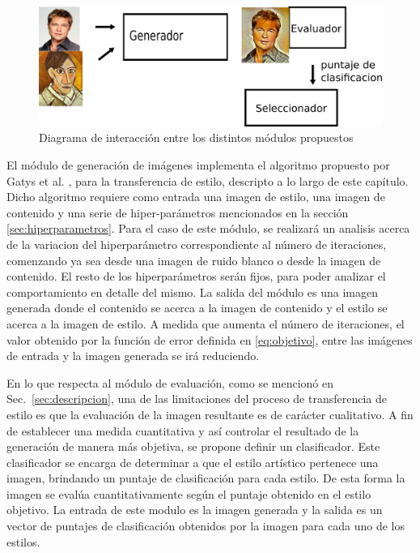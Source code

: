 \documentclass[a4paper,11pt,spanish]{book}
\begin{document}
      \begin{figure}[h]
	\begin{center}
	  \includegraphics[width=\linewidth]{./img/diagrama.png}
	\end{center}
	\caption{Diagrama de interacción entre los distintos módulos propuestos}
	\label{fig:diagrama}
      \end{figure}

      
      El módulo de generación de imágenes implementa el algoritmo propuesto por Gatys et al. \cite{Gatys:Neural_Style}, para la transferencia de estilo, descripto a lo largo 
      de este capítulo. 
      Dicho algoritmo requiere como entrada una imagen de estilo, una imagen de contenido y una serie de hiper-parámetros mencionados en la sección \ref{sec:hiperparametros}.
      Para el caso de este módulo, se realizará un analisis acerca de la variacion del hiperparámetro correspondiente al número de iteraciones, comenzando ya sea desde una imagen
      de ruido blanco o desde la imagen de contenido. El resto de los hiperparámetros serán fijos, para poder analizar el comportamiento en detalle del mismo.
      La salida del módulo es una imagen generada donde el contenido se acerca a la imagen de contenido y el estilo se acerca a la imagen de estilo. 
      A medida que aumenta el número de iteraciones, el valor obtenido por la función de error definida en \eqref{eq:objetivo}, entre las imágenes de entrada y la imagen 
      generada se irá reduciendo. 

      En lo que respecta al módulo de evaluación, como se mencionó en Sec.~\ref{sec:descripcion}, una de las limitaciones del proceso de transferencia de estilo 
      es que la evaluación de la imagen resultante es de carácter cualitativo.
      A fin de establecer una medida cuantitativa y así controlar el resultado de la generación de manera más objetiva, se propone definir un clasificador. 
      Este clasificador se encarga de determinar a que el estilo artístico pertenece una imagen, brindando un puntaje  de clasificación para cada estilo.
      De esta forma la imagen se evalúa cuantitativamente según el puntaje obtenido en el estilo objetivo.
      La entrada de este modulo es la imagen generada y la salida es un vector de puntajes de clasificación obtenidos por la imagen para cada uno de los estilos.
\end{document}
